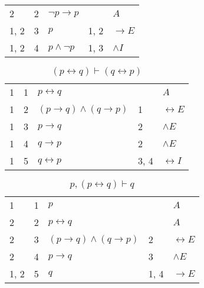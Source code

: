 \documentclass{article}
\begin{document}
\begin{table}[htbp]
\begin{tabular}{lrlll}
{2} & 2 & $¬p→p$ & {} & $A$ \\
{1, 2} & 3 & $p$ & {1, 2} & $→E$ \\
{1, 2} & 4 & $p∧ ¬p$ & {1, 3} & $∧I$ \\
\end{tabular}
\end{table}\begin{table}[htbp]\caption*{$(p↔q) ⊢ (q↔p)$}\centering\begin{tabular}{lrlll}
{1} & 1 & $p↔q$ & {} & $A$ \\
{1} & 2 & $(p→q)∧(q→p)$ & {1} & $↔E$ \\
{1} & 3 & $p→q$ & {2} & $∧E$ \\
{1} & 4 & $q→p$ & {2} & $∧E$ \\
{1} & 5 & $q↔p$ & {3, 4} & $↔I$ \\
\end{tabular}
\end{table}\begin{table}[htbp]\caption*{$p,(p↔q) ⊢ q$}\centering\begin{tabular}{lrlll}
{1} & 1 & $p$ & {} & $A$ \\
{2} & 2 & $p↔q$ & {} & $A$ \\
{2} & 3 & $(p→q)∧(q→p)$ & {2} & $↔E$ \\
{2} & 4 & $p→q$ & {3} & $∧E$ \\
{1, 2} & 5 & $q$ & {1, 4} & $→E$ \\
\end{tabular}
\end{table}
\end{document}
